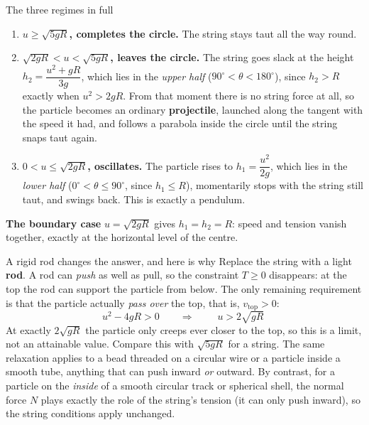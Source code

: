 \begin{figure}[htbp]
\centering
{}
\end{figure}

\begin{keybox}{The three regimes in full}
\begin{enumerate}
\item \textbf{$u\ge\sqrt{5gR}$, completes the circle.} The string stays taut all the way round.
\item \textbf{$\sqrt{2gR}<u<\sqrt{5gR}$, leaves the circle.} The string goes slack at the height
      $h_2=\dfrac{u^{2}+gR}{3g}$, which lies in the \emph{upper half}
      ($90^\circ<\theta<180^\circ$), since $h_2>R$ exactly when $u^{2}>2gR$. From that moment there is no string force at all, so the particle
      becomes an ordinary \textbf{projectile}, launched along the tangent with the speed it had, and
      follows a parabola inside the circle until the string snaps taut again.
\item \textbf{$0<u\le\sqrt{2gR}$, oscillates.} The particle rises to $h_1=\dfrac{u^{2}}{2g}$, which
      lies in the \emph{lower half} ($0^\circ<\theta\le90^\circ$, since $h_1\le R$), momentarily stops with the string
      still taut, and swings back. This is exactly a pendulum.
\end{enumerate}
\textbf{The boundary case} $u=\sqrt{2gR}$ gives $h_1=h_2=R$: speed and tension vanish together, exactly
at the horizontal level of the centre.
\end{keybox}

\begin{remarkbox}{A rigid rod changes the answer, and here is why}
Replace the string with a light \textbf{rod}. A rod can \emph{push} as well as pull, so the constraint
$T\ge0$ disappears: at the top the rod can support the particle from below. The only remaining
requirement is that the particle actually \emph{pass over} the top, that is, $v_{\text{top}}>0$:
\[
u^{2}-4gR>0
\qquad\Longrightarrow\qquad
\boxed{\;u>2\sqrt{gR}\;}
\]
At exactly $2\sqrt{gR}$ the particle only creeps ever closer to the top, so this is a limit, not an
attainable value. Compare this with
$\sqrt{5gR}$ for a string. The same relaxation applies to a bead threaded on a circular wire or a
particle inside a smooth tube, anything that can push inward \emph{or} outward. By contrast, for a
particle on the \emph{inside} of a smooth circular track or spherical shell, the normal force $N$
plays exactly the role of the string's tension (it can only push inward), so the string conditions apply
unchanged.
\end{remarkbox}

